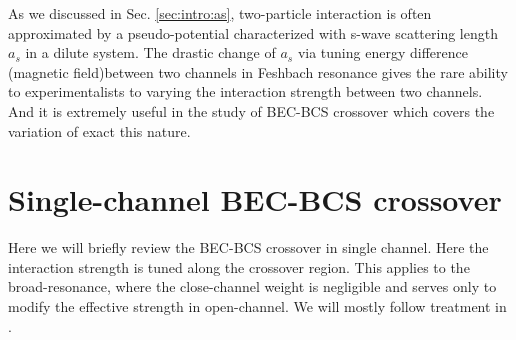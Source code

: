As we discussed in Sec. \ref{sec:intro:as}, two-particle interaction is often approximated by a pseudo-potential characterized with s-wave scattering length $a_{s}$ in a dilute system.   The drastic  change  of $a_{s}$  via tuning energy difference (magnetic field)between two channels in Feshbach resonance gives the rare ability to experimentalists to varying the interaction strength between two channels.  And it is extremely useful in the study of BEC-BCS crossover which covers the variation of exact this nature.  


\section{Single-channel BEC-BCS crossover}
Here we will briefly review the BEC-BCS crossover in single channel.   Here the interaction strength is tuned along the crossover region.  This applies to the broad-resonance, where the close-channel weight is negligible and serves only to modify the effective strength in open-channel.  We will mostly follow treatment in \cite{RanderiaBEC, Randeria1997, Randeria2008}.
